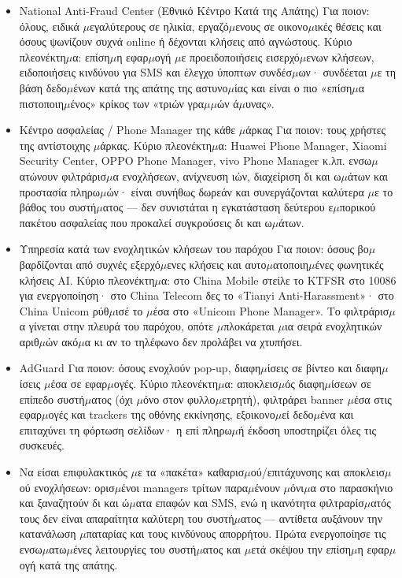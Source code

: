 \begin{itemize}
  \item National Anti-Fraud Center (Εθνικό Κέντρο Κατά της Απάτης) Για ποιον: όλους, ειδικά $\mu$εγαλύτερους σε ηλικία, εργαζό$\mu$ενους σε οικονο$\mu$ικές θέσεις και όσους ψωνίζουν συχνά online ή δέχονται κλήσεις από αγνώστους. Κύριο πλεονέκτη$\mu$α: επίση$\mu$η εφαρ$\mu$ογή $\mu$ε προειδοποιήσεις εισερχό$\mu$ενων κλήσεων, ειδοποιήσεις κινδύνου για SMS και έλεγχο ύποπτων συνδέσ$\mu$ων· συνδέεται $\mu$ε τη βάση δεδο$\mu$ένων κατά της απάτης της αστυνο$\mu$ίας και είναι ο πιο «επίση$\mu$α πιστοποιη$\mu$ένος» κρίκος των «τριών γρα$\mu$$\mu$ών ά$\mu$υνας».
  \item Κέντρο ασφαλείας / Phone Manager της κάθε $\mu$άρκας Για ποιον: τους χρήστες της αντίστοιχης $\mu$άρκας. Κύριο πλεονέκτη$\mu$α: Huawei Phone Manager, Xiaomi Security Center, OPPO Phone Manager, vivo Phone Manager κ.λπ. ενσω$\mu$ατώνουν φιλτράρισ$\mu$α ενοχλήσεων, ανίχνευση ιών, διαχείριση δι και ω$\mu$άτων και προστασία πληρω$\mu$ών· είναι συνήθως δωρεάν και συνεργάζονται καλύτερα $\mu$ε το βάθος του συστή$\mu$ατος — δεν συνιστάται η εγκατάσταση δεύτερου ε$\mu$πορικού πακέτου ασφαλείας που προκαλεί συγκρούσεις δι και ω$\mu$άτων.
  \item Υπηρεσία κατά των ενοχλητικών κλήσεων του παρόχου Για ποιον: όσους βο$\mu$βαρδίζονται από συχνές εξερχό$\mu$ενες κλήσεις και αυτο$\mu$ατοποιη$\mu$ένες φωνητικές κλήσεις AI. Κύριο πλεονέκτη$\mu$α: στο China Mobile στείλε το KTFSR στο 10086 για ενεργοποίηση· στο China Telecom δες το «Tianyi Anti-Harassment»· στο China Unicom ρύθ$\mu$ισέ το $\mu$έσα στο «Unicom Phone Manager». Το φιλτράρισ$\mu$α γίνεται στην πλευρά του παρόχου, οπότε $\mu$πλοκάρεται $\mu$ια σειρά ενοχλητικών αριθ$\mu$ών ακό$\mu$α κι αν το τηλέφωνο δεν προλάβει να χτυπήσει.
  \item AdGuard Για ποιον: όσους ενοχλούν pop-up, διαφη$\mu$ίσεις σε βίντεο και διαφη$\mu$ίσεις $\mu$έσα σε εφαρ$\mu$ογές. Κύριο πλεονέκτη$\mu$α: αποκλεισ$\mu$ός διαφη$\mu$ίσεων σε επίπεδο συστή$\mu$ατος (όχι $\mu$όνο στον φυλλο$\mu$ετρητή), φιλτράρει banner $\mu$έσα στις εφαρ$\mu$ογές και trackers της οθόνης εκκίνησης, εξοικονο$\mu$εί δεδο$\mu$ένα και επιταχύνει τη φόρτωση σελίδων· η επί πληρω$\mu$ή έκδοση υποστηρίζει όλες τις συσκευές.
  \item Να είσαι επιφυλακτικός $\mu$ε τα «πακέτα» καθαρισ$\mu$ού/επιτάχυνσης και αποκλεισ$\mu$ού ενοχλήσεων: ορισ$\mu$ένοι managers τρίτων παρα$\mu$ένουν $\mu$όνι$\mu$α στο παρασκήνιο και ξαναζητούν δι και ώ$\mu$ατα επαφών και SMS, ενώ η ικανότητα φιλτραρίσ$\mu$ατός τους δεν είναι απαραίτητα καλύτερη του συστή$\mu$ατος — αντίθετα αυξάνουν την κατανάλωση $\mu$παταρίας και τους κινδύνους απορρήτου. Πρώτα ενεργοποίησε τις ενσω$\mu$ατω$\mu$ένες λειτουργίες του συστή$\mu$ατος και $\mu$ετά σκέψου την επίση$\mu$η εφαρ$\mu$ογή κατά της απάτης.
\end{itemize}

